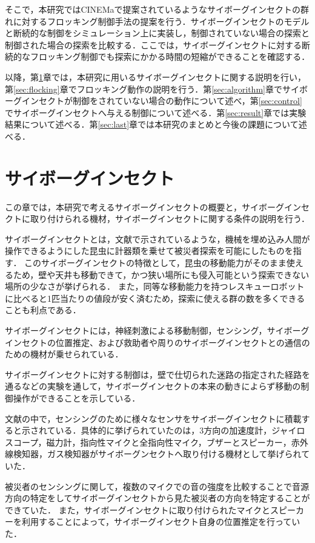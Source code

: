 \documentclass[a4paper,11pt]{jarticle}
\begin{document}
	そこで，本研究ではCINEMaで提案されているようなサイボーグインセクトの群れに対するフロッキング制御手法の提案を行う．サイボーグインセクトのモデルと断続的な制御をシミュレーション上に実装し，制御されていない場合の探索と制御された場合の探索を比較する．ここでは，サイボーグインセクトに対する断続的なフロッキング制御でも探索にかかる時間の短縮ができることを確認する．
	
	以降，第\ref{sec:CyborgInsect}章では，本研究に用いるサイボーグインセクトに関する説明を行い，第\ref{sec:flocking}章でフロッキング動作の説明を行う．第\ref{sec:algorithm}章でサイボーグインセクトが制御をされていない場合の動作について述べ，第\ref{sec:control}でサイボーグインセクトへ与える制御について述べる．第\ref{sec:result}章では実験結果について述べる．第\ref{sec:last}章では本研究のまとめと今後の課題について述べる．
	\section{サイボーグインセクト}
	\label{sec:CyborgInsect}
	この章では，本研究で考えるサイボーグインセクトの概要と，サイボーグインセクトに取り付けられる機材，サイボーグインセクトに関する条件の説明を行う．
	
	サイボーグインセクトとは，文献\cite{CyborgInsect}で示されているような，機械を埋め込み人間が操作できるようにした昆虫に計器類を乗せて被災者探索を可能にしたものを指す．
	このサイボーグインセクトの特徴として，昆虫の移動能力がそのまま使えるため，壁や天井も移動できて，かつ狭い場所にも侵入可能という探索できない場所の少なさが挙げられる．
	また，同等な移動能力を持つレスキューロボットに比べると1匹当たりの値段が安く済むため，探索に使える群の数を多くできることも利点である．
	
	サイボーグインセクトには，神経刺激による移動制御，センシング，サイボーグインセクトの位置推定、および救助者や周りのサイボーグインセクトとの通信のための機材が乗せられている．
	
	サイボーグインセクトに対する制御は，壁で仕切られた迷路の指定された経路を通るなどの実験を通して，サイボーグインセクトの本来の動きによらず移動の制御操作ができることを示している\cite{CINEMa}．
	
	文献\cite{CINEMa}の中で，センシングのために様々なセンサをサイボーグインセクトに積載すると示されている．具体的に挙げられていたのは，3方向の加速度計，ジャイロスコープ，磁力計，指向性マイクと全指向性マイク，ブザーとスピーカー，赤外線検知器，ガス検知器がサイボーグンセクトへ取り付ける機材として挙げられていた．
	
	被災者のセンシングに関して，複数のマイクでの音の強度を比較することで音源方向の特定をしてサイボーグインセクトから見た被災者の方向を特定することができていた．
	また，サイボーグインセクトに取り付けられたマイクとスピーカーを利用することによって，サイボーグインセクト自身の位置推定を行っていた．
	
\end{document}
